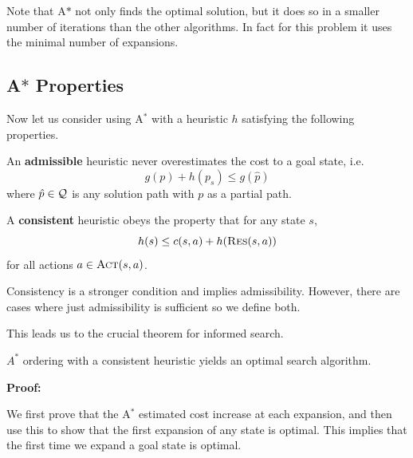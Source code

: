 \documentclass[10pt]{article}
\begin{document}
\noindent Note that A$*$ not only finds the optimal solution, but it does so in 
a smaller number of iterations than the other algorithms. In fact for this problem
it uses the minimal number of expansions.

\subsection{A$*$ Properties} 

Now let us consider using A$^*$ with a heuristic $h$ satisfying the following properties.

\begin{defn}
  An \textbf{admissible} heuristic never overestimates the cost to a goal state, i.e.  \[g(p) +
  h(p_s) \leq g(\hat{p})\] where $\hat{p}\in \mathcal{Q}$ is any solution path with 
  $p$ as a partial path.
\end{defn}

\begin{defn}
  A  \textbf{consistent} heuristic obeys the property that for any state $s$, \[h(s) \leq c(s, a)
  + h(\mathrm{\textsc{Res}}(s, a))\]
 for all
  actions $a \in \mathrm{\textsc{Act}}(s, a)$.
\end{defn}

Consistency is a stronger condition and implies admissibility. However, there are cases where just admissibility is sufficient so we define both.


This leads us to the crucial theorem for informed search.

\begin{theorem}
  $A^*$ ordering  with a consistent heuristic yields an optimal search algorithm.
\end{theorem}

\noindent \textbf{Proof:}

We first prove that the A$^*$ estimated cost increase at each expansion, and then use this to show that the first expansion of any state is optimal. This implies that the first time we expand a goal state is optimal.  
\end{document}

